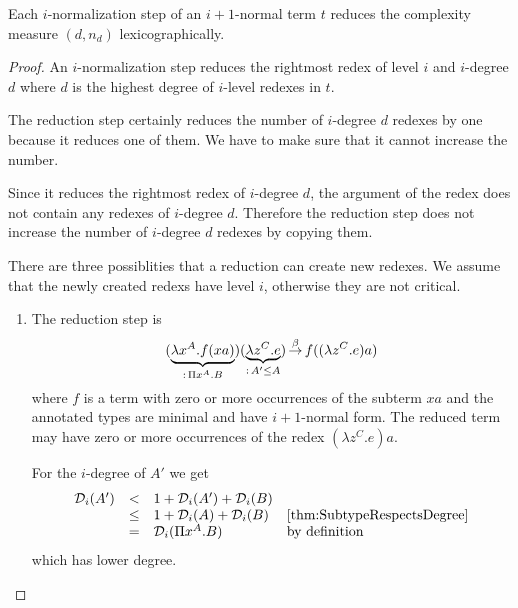 \begin{theorem}
    Each $i$-normalization step of an $i+1$-normal term $t$ reduces the
    complexity measure $(d, n_d)$ lexicographically.
    \label{thm:INormalizationStepReduceComplexity}

    \begin{proof}
        An $i$-normalization step reduces the rightmost redex of level $i$ and
        $i$-degree $d$ where $d$ is the highest degree of $i$-level redexes in
        $t$.

        The reduction step certainly reduces the number of $i$-degree $d$
        redexes by one because it reduces one of them. We have to make sure that
        it cannot increase the number.

        Since it reduces the rightmost redex of $i$-degree $d$, the argument of
        the redex
        does not contain any redexes of $i$-degree $d$. Therefore the reduction
        step does not increase the number of $i$-degree $d$ redexes by copying
        them.

        There are three possiblities that a reduction can create new redexes. We
        assume that the newly created redexs have level $i$, otherwise they are
        not critical.
        \begin{enumerate}
            \item The reduction step is
                $$
                (\underbrace{\lambda x^A. f(xa)}_{:\, \Pi x^A. B})
                (\underbrace{\lambda z^C. e}_{:\, A' \le A})
                {\,\stackrel{\beta}{\to}\,}
                f((\lambda z^C.e)a)
                $$
                where $f$ is a term with zero or more occurrences of the subterm
                $x a$ and the annotated types are minimal and have $i+1$-normal
                form. The reduced term may have zero or more occurrences of the
                redex $(\lambda z^C.e) a$.

                For the $i$-degree of $A'$ we get
                $$
                \begin{array}{llll}
                    {\cal D}_i(A')
                    &<& 1 + {\cal D}_i(A') + {\cal D}_i(B)
                    \\
                    &\le & 1 + {\cal D}_i(A) + {\cal D}_i(B)
                    & \text{\ref{thm:SubtypeRespectsDegree}}
                    \\
                    & = & {\cal D}_i(\Pi x^A. B) &\text{by definition}
                \end{array}
                $$
                which has lower degree.



\end{enumerate}
\end{proof}
\end{theorem}
